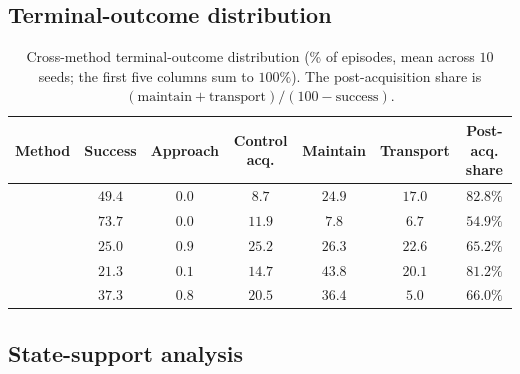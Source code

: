 \subsection{Terminal-outcome distribution}
\label{app:terminal_outcomes}

\begin{table}[H]
\centering
\caption{Cross-method terminal-outcome distribution (\% of episodes, mean across $10$ seeds; the first five columns sum to $100\%$). The post-acquisition share is $(\text{maintain}+\text{transport})/(100-\text{success})$.}
\label{tab:cross_method_outcomes}
\begin{tabular}{lcccccc}
\toprule
\textbf{Method} & \textbf{Success} & \textbf{Approach} & \textbf{Control acq.} & \textbf{Maintain} & \textbf{Transport} & \textbf{Post-acq. share} \\
\midrule
\fb{}    & $49.4$ & $0.0$ & $8.7$  & $24.9$ & $17.0$ & $82.8\%$ \\
\gciql{} & $73.7$ & $0.0$ & $11.9$ & $7.8$  & $6.7$  & $54.9\%$ \\
\crl{}   & $25.0$ & $0.9$ & $25.2$ & $26.3$ & $22.6$ & $65.2\%$ \\
\rldp{}  & $21.3$ & $0.1$ & $14.7$ & $43.8$ & $20.1$ & $81.2\%$ \\
\psm{}   & $37.3$ & $0.8$ & $20.5$ & $36.4$ & $5.0$  & $66.0\%$ \\
\bottomrule
\end{tabular}
\end{table}

\subsection{State-support analysis}
\label{app:support}

